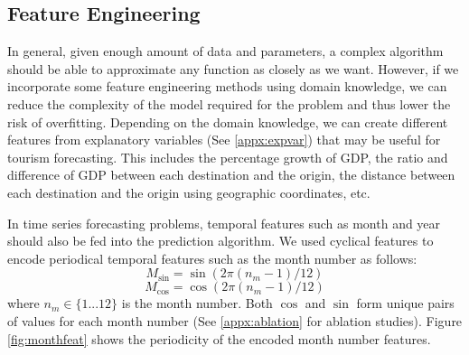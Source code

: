 \documentclass{article}
\begin{document}
\subsection{Feature Engineering}
In general, given enough amount of data and parameters, a complex algorithm should be able to approximate any function as closely as we want. However, if we incorporate some feature engineering methods using domain knowledge, we can reduce the complexity of the model required for the problem and thus lower the risk of overfitting. 
Depending on the domain knowledge, we can create different features from explanatory variables (See \ref{appx:expvar}) that may be useful for tourism forecasting. This includes the percentage growth of GDP, the ratio and difference of GDP between each destination and the origin, the distance between each destination and the origin using geographic coordinates, etc.

In time series forecasting problems, temporal features such as month and year should also be fed into the prediction algorithm. We used cyclical features to encode periodical temporal features such as the month number as follows:
\[
M_{\sin} = \sin (2 \pi (n_m-1)/12)
\]
\[
M_{\cos} = \cos (2 \pi (n_m-1)/12)
\]
where $n_m \in \{1...12\}$ is the month number. Both $\cos$ and $\sin$ form unique pairs of values for each month number (See \ref{appx:ablation} for ablation studies). Figure \ref{fig:monthfeat} shows the periodicity of the encoded month number features.
\end{document}
